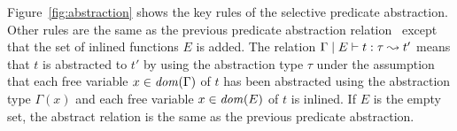 
Figure~\ref{fig:abstraction} shows the key rules of the selective
predicate abstraction.  Other rules are the same as the previous
predicate abstraction relation~\cite{KobayashiPLDI2011} except that the
set of inlined functions $E$ is added.  The relation
${\Gamma} \mid {E} \vdash {t} : {\tau} \leadsto {t'}$ means that $t$ is abstracted to $t'$ by
using the abstraction type $\tau$ under the assumption that each free
variable $x \in \mathit{dom}(\Gamma)$ of $t$ has been abstracted using the
abstraction type $\Gamma(x)$ and each free variable $x \in \mathit{dom}(E)$ of
$t$ is inlined.
If $E$ is the empty set, the abstract relation is the same as the
previous predicate abstraction.

